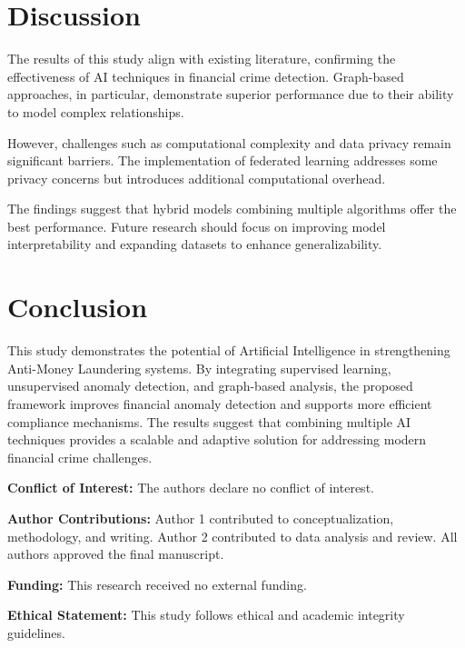 \documentclass[twoside,twocolumn,10pt]{article}
\begin{document}
\section{Discussion}
\label{sec:discussion}
\fontsize{11}{13}\selectfont

The results of this study align with existing literature, confirming the effectiveness of AI techniques in financial crime detection. Graph-based approaches, in particular, demonstrate superior performance due to their ability to model complex relationships.

However, challenges such as computational complexity and data privacy remain significant barriers. The implementation of federated learning addresses some privacy concerns but introduces additional computational overhead.

The findings suggest that hybrid models combining multiple algorithms offer the best performance. Future research should focus on improving model interpretability and expanding datasets to enhance generalizability.

\section{Conclusion}
\fontsize{11}{13}\selectfont

This study demonstrates the potential of Artificial Intelligence in strengthening Anti-Money Laundering systems. By integrating supervised learning, unsupervised anomaly detection, and graph-based analysis, the proposed framework improves financial anomaly detection and supports more efficient compliance mechanisms. The results suggest that combining multiple AI techniques provides a scalable and adaptive solution for addressing modern financial crime challenges.

\vspace{0.5cm}

\small
\textbf{Conflict of Interest:} The authors declare no conflict of interest.

\textbf{Author Contributions:} Author 1 contributed to conceptualization, methodology, and writing. Author 2 contributed to data analysis and review. All authors approved the final manuscript.

\textbf{Funding:} This research received no external funding.

\textbf{Ethical Statement:} This study follows ethical and academic integrity guidelines.

\balance
\fontsize{11}{13}\selectfont
\printbibliography
\end{document}
